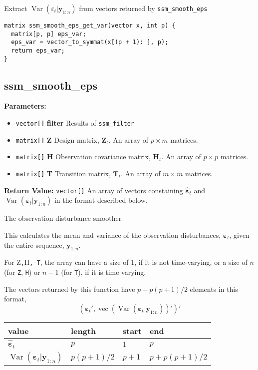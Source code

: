 \documentclass[]{book}
\providecommand{\tightlist}{%
  \setlength{\itemsep}{0pt}\setlength{\parskip}{0pt}}
\DeclareMathOperator{\Var}{Var}
\DeclareMathOperator{\VEC}{vec}
\newcommand{\mat}[1]{\boldsymbol{#1}}
\renewcommand{\vec}[1]{\boldsymbol{#1}}
\begin{document}
Extract \(\Var(\varepsilon_t|\vec{y}_{1:n})\) from vectors returned by
\texttt{ssm\_smooth\_eps}

\begin{verbatim}
matrix ssm_smooth_eps_get_var(vector x, int p) {
  matrix[p, p] eps_var;
  eps_var = vector_to_symmat(x[(p + 1): ], p);
  return eps_var;
}
\end{verbatim}

\subsection{ssm\_smooth\_eps}\label{ssmux5fsmoothux5feps}

\textbf{Parameters:}

\begin{itemize}
\tightlist
\item
  \texttt{vector{[}{]}} \textbf{filter} Results of \texttt{ssm\_filter}
\item
  \texttt{matrix{[}{]}} \textbf{Z} Design matrix, \(\mat{Z}_t\). An
  array of \(p \times m\) matrices.
\item
  \texttt{matrix{[}{]}} \textbf{H} Observation covariance matrix,
  \(\mat{H}_t\). An array of \(p \times p\) matrices.
\item
  \texttt{matrix{[}{]}} \textbf{T} Transition matrix, \(\mat{T}_t\). An
  array of \(m \times m\) matrices.
\end{itemize}

\textbf{Return Value:} \texttt{vector{[}{]}} An array of vectors
constaining \(\hat{\vec{\varepsilon}}_t\) and
\(\Var(\vec{\varepsilon}_t | \vec{y}_{1:n})\) in the format described
below.

The observation disturbance smoother

This calculates the mean and variance of the observation disturbances,
\(\vec{\varepsilon}_t\), given the entire sequence, \(\vec{y}_{1:n}\).

For Z\texttt{,}H\texttt{,\ T}, the array can have a size of 1, if it is
not time-varying, or a size of \(n\) (for \texttt{Z}, \texttt{H}) or
\(n - 1\) (for \texttt{T}), if it is time varying.

The vectors returned by this function have \(p + p (p + 1) / 2\)
elements in this format, \[
(\hat{\vec{\varepsilon}}_t', \VEC(\Var(\vec{\varepsilon}_t | \vec{y}_{1:n}))' )'
\]

\begin{longtable}[c]{@{}llll@{}}
\toprule
value & length & start & end\tabularnewline
\midrule
\endhead
\(\hat{\vec{\varepsilon}}_t\) & \(p\) & \(1\) & \(p\)\tabularnewline
\(\Var(\vec{\varepsilon}_t | \vec{y}_{1:n})\) & \(p (p + 1) / 2\) &
\(p + 1\) & \(p + p (p + 1) / 2\)\tabularnewline
\bottomrule
\end{longtable}
\end{document}

